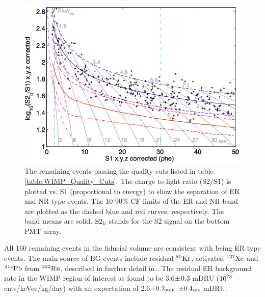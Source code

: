  \begin{figure}[h!]\centering
\includegraphics[width=120mm]{Chapter_LUX_Det/LUX_Result.png}
\caption{The remaining events passing the quality cuts listed in table \ref{table:WIMP_Quality_Cuts}. The charge to light ratio (S2/S1) is plotted vs. S1 (proportional to energy) to show the separation of ER and NR type events. The 10-90\% CF limits of the ER and NR band are plotted as the dashed blue and red curves, respectively. The band means are solid. $\rm S2_b$ stands for the S2 signal on the bottom PMT array. }
\label{fig:LUX_Result}
\end{figure}

\newpage

All 160 remaining events in the fiducial volume are consistent with being ER type events. The main source of BG events include residual $\rm^{85}Kr$, activated $\rm^{127}Xe$ and $\rm^{214}Pb$ from $\rm^{222}Rn$, described in further detail in \cite{LUX_BG}. The residual ER background rate in the WIMP region of interest as found to be 3.6$\rm\pm$0.3 mDRU ($\rm 10^{?3}$ cnts/keVee/kg/day) with an expectation of 2.6$\rm\pm 0.2_{stat}$ $\rm\pm 0.4_{sys}$ mDRU.


